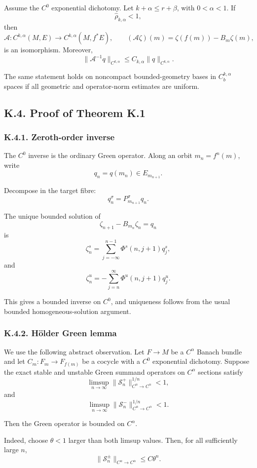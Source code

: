 \documentclass[12pt,a4paper]{article}
\theoremstyle{plain}
\numberwithin{equation}{section}
\numberwithin{theorem}{section}
\begin{document}
Assume the $C^0$ exponential dichotomy. Let $k+\alpha\le r+\beta$, with $0<\alpha<1$. If
\[
\widehat\rho_{k,\alpha}<1,
\]
then
\[
\mathcal A:
C^{k,\alpha}(M,E)
\to
C^{k,\alpha}(M,f^*E),
\qquad
(\mathcal A\zeta)(m)=
\zeta(f(m))-B_m\zeta(m),
\]
is an isomorphism. Moreover,
\[
\|\mathcal A^{-1}q\|_{C^{k,\alpha}}
\le
C_{k,\alpha}
\|q\|_{C^{k,\alpha}}.
\]

The same statement holds on noncompact bounded-geometry bases in $C_b^{k,\alpha}$ spaces if all geometric and operator-norm estimates are uniform.

\subsection{K.4. Proof of Theorem K.1}

\subsubsection{K.4.1. Zeroth-order inverse}

The $C^0$ inverse is the ordinary Green operator. Along an orbit $m_n=f^n(m)$, write
\[
q_n=q(m_n)\in E_{m_{n+1}}.
\]

Decompose in the target fibre:
\[
q_n^\sigma=P_{m_{n+1}}^\sigma q_n.
\]

The unique bounded solution of
\[
\zeta_{n+1}-B_{m_n}\zeta_n=q_n
\]
is
\[
\zeta_n^s
=
\sum_{j=-\infty}^{n-1}
\Phi^s(n,j+1)q_j^s,
\]
and
\[
\zeta_n^u
=
-
\sum_{j=n}^{\infty}
\Phi^u(n,j+1)q_j^u.
\]

This gives a bounded inverse on $C^0$, and uniqueness follows from the usual bounded homogeneous-solution argument.

\subsubsection{K.4.2. H\"older Green lemma}

We use the following abstract observation. Let $F\to M$ be a $C^\alpha$ Banach bundle and let $C_m:F_m\to F_{f(m)}$ be a cocycle with a $C^0$ exponential dichotomy. Suppose the exact stable and unstable Green summand operators on $C^\alpha$ sections satisfy
\[
\limsup_{n\to\infty}
\|\mathcal S_n^+\|_{C^\alpha\to C^\alpha}^{1/n}<1,
\]
and
\[
\limsup_{n\to\infty}
\|\mathcal S_n^-\|_{C^\alpha\to C^\alpha}^{1/n}<1.
\]

Then the Green operator is bounded on $C^\alpha$.

Indeed, choose $\theta<1$ larger than both limsup values. Then, for all sufficiently large $n$,
\[
\|\mathcal S_n^\pm\|_{C^\alpha\to C^\alpha}
\le
C\theta^n.
\]
\end{document}
